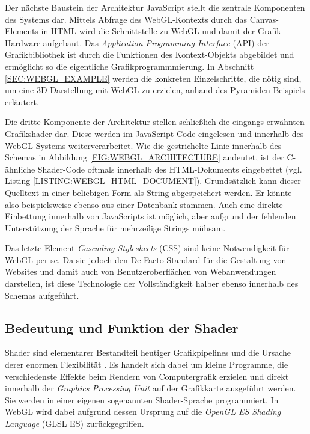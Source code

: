 Der nächste Baustein der Architektur JavaScript stellt die zentrale Komponenten des Systems dar. Mittels Abfrage des WebGL-Kontexts durch das Canvas-Elements in HTML wird die Schnittstelle zu WebGL und damit der Grafik-Hardware aufgebaut. Das \emph{Application Programming Interface} (API) der Grafikbibliothek ist durch die Funktionen des Kontext-Objekts abgebildet und ermöglicht so die eigentliche Grafikprogrammmierung. In Abschnitt \ref{SEC:WEBGL_EXAMPLE} werden die konkreten Einzelschritte, die nötig sind, um eine 3D-Darstellung mit WebGL zu erzielen, anhand des Pyramiden-Beispiels erläutert.

Die dritte Komponente der Architektur stellen schließlich die eingangs erwähnten Grafikshader dar. Diese werden im JavaScript-Code eingelesen und innerhalb des WebGL-Systems weiterverarbeitet. Wie die gestrichelte Linie innerhalb des Schemas in Abbildung \ref{FIG:WEBGL_ARCHITECTURE} andeutet, ist der C-ähnliche Shader-Code oftmals innerhalb des HTML-Dokuments eingebettet (vgl. Listing \ref{LISTING:WEBGL_HTML_DOCUMENT}). Grundsätzlich kann dieser Quelltext in einer beliebigen Form als String abgespeichert werden. Er könnte also beispielsweise ebenso aus einer Datenbank stammen. Auch eine direkte Einbettung innerhalb von JavaScripts ist möglich, aber aufgrund der fehlenden Unterstützung der Sprache für mehrzeilige Strings mühsam.

Das letzte Element \emph{Cascading Stylesheets} (CSS) sind keine Notwendigkeit für WebGL per se. Da sie jedoch den De-Facto-Standard für die Gestaltung von Websites und damit auch von Benutzeroberflächen von Webanwendungen darstellen, ist diese Technologie der Vollständigkeit halber ebenso innerhalb des Schemas aufgeführt.

\subsection{Bedeutung und Funktion der Shader}
\label{SEC:WEBGL_SHADER}

Shader sind elementarer Bestandteil heutiger Grafikpipelines und die Ursache derer enormen Flexibilität \autocite[722\psq]{Foley:CG_PRINCIPLES_AND_PRACTICE}. Es handelt sich dabei um kleine Programme, die verschiedenste Effekte beim Rendern von Computergrafik erzielen und direkt innerhalb der \emph{Graphics Processing Unit} auf der Grafikkarte ausgeführt werden. Sie werden in einer eigenen sogenannten Shader-Sprache programmiert. In WebGL wird dabei aufgrund dessen Ursprung auf die \emph{OpenGL ES Shading Language} (GLSL ES) zurückgegriffen.

